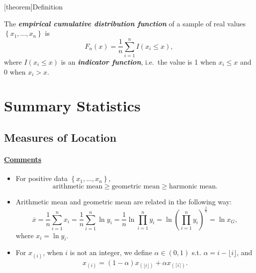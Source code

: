 \documentclass[12pt]{report}
\theoremstyle{definition}
\begin{document}
[theorem]{Definition}
\begin{empirical CDF}
    The \textbf{\emph{empirical cumulative distribution function}} of a sample of
    real values $\left\{x_1,\ldots,x_n\right\}$ is
    \[
        F_n(x)=\frac{1}{n}\sum_{i=1}^{n} I(x_i\le x),
    \]
    where $I(x_i\le x)$ is an \textbf{\emph{indicator function}}, i.e.\ the
    value is 1 when $x_i\le x$ and 0 when $x_i>x$.
\end{empirical CDF}

\section{Summary Statistics}

\subsection{Measures of Location}

\noindent{}
\paragraph{\underline{Comments}}
\begin{itemize}
        \item For positive data $\left\{x_1,\ldots,x_n\right\}$,
            \[
                \text{arithmetic mean}\ge\text{geometric mean}\ge\text{harmonic
                mean}.
            \]
        \item Arithmetic mean and geometric mean are related in the following
            way:
            \[
                \overline{x} = \frac{1}{n}\sum_{i=1}^{n} x_i =
                \frac{1}{n}\sum_{i=1}^{n} \ln{y_i} =
                \frac{1}{n}\ln{\prod_{i=1}^{n} y_i} =
                \ln{{\left(\prod_{i=1}^{n} y_i\right)}^{\frac{1}{n}}} =
                \ln{x_G},
            \]
            where $x_i = \ln{y_i}$.
        \item
            For $x_{(i)}$, when $i$ is not an integer, we define
            $\alpha\in(0,1)$ s.t. $\alpha=i-\lfloor i\rfloor $, and
            \[
                x_{(i)}=(1-\alpha)x_{(\lfloor i\rfloor)} 
                + \alpha x_{(\lceil i\rceil )}.
            \]
\end{itemize} 
\end{document}
